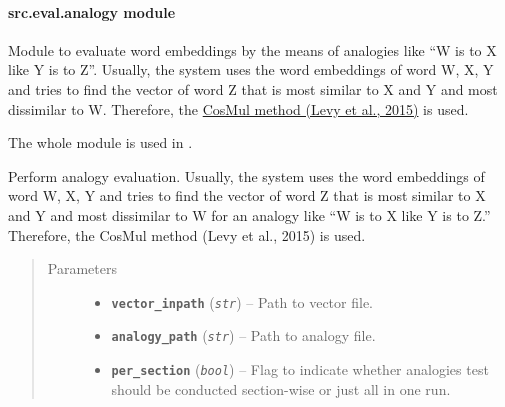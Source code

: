 \documentclass[letterpaper,10pt,english]{sphinxmanual}
\begin{document}
\paragraph{src.eval.analogy module}
\label{src.eval:module-src.eval.analogy}\label{src.eval:src-eval-analogy-module}
Module to evaluate word embeddings by the means of analogies like ``W is to X like Y is to Z''. Usually,
the system uses the word embeddings of word W, X, Y and tries to find the vector of word Z that is most similar to
X and Y and most dissimilar to W.
Therefore, the \href{https://transacl.org/ojs/index.php/tacl/article/viewFile/570/124}{CosMul method (Levy et al., 2015)}
is used.

The whole module is used in .

\begin{fulllineitems}
\label{src.eval:src.eval.analogy.analogy_eval}
Perform analogy evaluation. Usually, the system uses the word embeddings of word W, X, Y and tries to find the
vector of word Z that is most similar to
X and Y and most dissimilar to W for an analogy like ``W is to X like Y is to Z.''
Therefore, the CosMul method (Levy et al., 2015) is used.
\begin{quote}\begin{description}
\item[{Parameters}] \leavevmode\begin{itemize}
\item {} 
\textbf{\texttt{vector\_inpath}} (\emph{\texttt{str}}) -- Path to  vector file.

\item {} 
\textbf{\texttt{analogy\_path}} (\emph{\texttt{str}}) -- Path to analogy file.

\item {} 
\textbf{\texttt{per\_section}} (\emph{\texttt{bool}}) -- Flag to indicate whether analogies test should be conducted section-wise or just all in
one run.

\end{itemize}

\end{description}\end{quote}

\end{fulllineitems}
\end{document}
